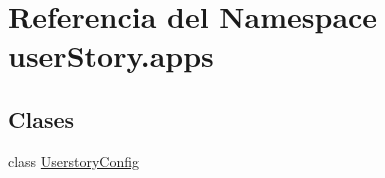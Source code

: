 \hypertarget{namespaceuser_story_1_1apps}{}\section{Referencia del Namespace user\+Story.\+apps}
\label{namespaceuser_story_1_1apps}
\subsection*{Clases}
\begin{DoxyCompactItemize}
\item 
class \hyperlink{classuser_story_1_1apps_1_1_userstory_config}{Userstory\+Config}
\end{DoxyCompactItemize}
